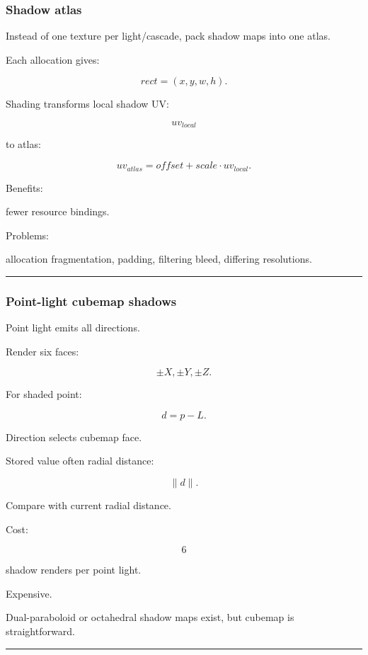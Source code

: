 \subsubsection{Shadow atlas}\label{shadow-atlas}

Instead of one texture per light/cascade, pack shadow maps into one atlas.

Each allocation gives:

\[
rect=
(x,y,w,h).
\]

Shading transforms local shadow UV:

\[
uv_{local}
\]

to atlas:

\[
uv_{atlas}
=
offset+
scale\cdot uv_{local}.
\]

Benefits:

fewer resource bindings.

Problems:

allocation fragmentation, padding, filtering bleed, differing resolutions.

\begin{center}\rule{0.5\linewidth}{0.5pt}\end{center}

\subsubsection{Point-light cubemap shadows}\label{point-light-cubemap-shadows}

Point light emits all directions.

Render six faces:

\[
\pm X,\pm Y,\pm Z.
\]

For shaded point:

\[
d=p-L.
\]

Direction selects cubemap face.

Stored value often radial distance:

\[
\|d\|.
\]

Compare with current radial distance.

Cost:

\[
6
\]

shadow renders per point light.

Expensive.

Dual-paraboloid or octahedral shadow maps exist, but cubemap is straightforward.

\begin{center}\rule{0.5\linewidth}{0.5pt}\end{center}

